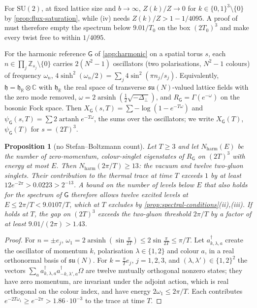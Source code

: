 \documentclass[11pt,a4paper]{amsart}
\newtheorem{proposition}[theorem]{Proposition}
\theoremstyle{definition}
\theoremstyle{remark}
\numberwithin{equation}{section}
\newcommand{\R}{\mathbb{R}}          %
\newcommand{\C}{\mathbb{C}}          %
\newcommand{\Z}{\mathbb{Z}}          %
\newcommand{\SU}{\mathrm{SU}}              %
\newcommand{\cube}[1]{(2#1)^3}             %
\newcommand{\Gharm}{\mathsf{G}}            %
\newcommand{\Mcirc}{\text{\upshape(M$^{\circ}$)}}   %
\newcommand{\Bcirc}{\text{\upshape(B$^{\circ}$)}}   %
\begin{document}
For $\SU(2)$, at fixed lattice size and $b\to\infty$, $Z(k)/Z\to0$ for $k\in\{0,1\}^3\setminus\{0\}$ by \cref{prop:flux-saturation}, while (iv) needs $Z(k)/Z>1-1/4095$. A proof of \Mcirc{} must therefore empty the spectrum below $9.01/T_0$ on the box $\cube{T_0}$ and make every twist free to within $1/4095$.

For the harmonic reference $\Gharm$ of \cref{app:harmonic} on a spatial torus $s$, each $n\in\prod_j\Z_{s_j}\setminus\{0\}$ carries $2(N^2-1)$ oscillators (two polarisations, $N^2-1$ colours) of frequency $\omega_n$, $4\sinh^2(\omega_n/2)=\sum_j4\sin^2(\pi n_j/s_j)$. Equivalently, $\mathfrak h=\mathfrak h_\R\otimes\C$ with $\mathfrak h_\R$ the real space of transverse $\mathfrak{su}(N)$-valued lattice fields with the zero mode removed, $\omega=2\operatorname{arsinh}(\frac12\sqrt{-\Delta_\perp})$, and $R_\Gharm=\Gamma(e^{-\omega})$ on the bosonic Fock space. Then $X_\Gharm(s,T)=\sum-\log(1-e^{-T\omega})$ and $\psi_\Gharm(s,T)=\sum2\operatorname{artanh}e^{-T\omega}$, the sums over the oscillators; we write $X_\Gharm(T)$, $\psi_\Gharm(T)$ for $s=\cube T$.

\begin{proposition}[no Stefan--Boltzmann count]\label{prop:no-stefan-boltzmann}
Let $T\ge3$ and let $N_{\mathrm{harm}}(E)$ be the number of zero-momentum, colour-singlet eigenstates of $R_\Gharm$ on $\cube T$ with energy at most $E$. Then $N_{\mathrm{harm}}(2\pi/T)\ge13$: the vacuum and twelve two-gluon singlets. Their contribution to the thermal trace at time $T$ exceeds $1$ by at least $12e^{-2\pi}>0.0223>2^{-13}$. A bound on the number of levels below $E$ that also holds for the spectrum of $\Gharm$ therefore allows twelve excited levels at $E\le2\pi/T<9.0107/T$, which \Bcirc{} at $T$ excludes by \cref{prop:spectral-conditions}(ii),(iii). If \Bcirc{} holds at $T$, the gap on $\cube T$ exceeds the two-gluon threshold $2\pi/T$ by a factor of at least $9.01/(2\pi)>1.43$.
\end{proposition}

\begin{proof}
For $n=\pm e_j$, $\omega_1=2\operatorname{arsinh}(\sin\frac\pi{2T})\le2\sin\frac\pi{2T}\le\pi/T$. Let $a^\dagger_{k,\lambda,a}$ create the oscillator of momentum $k$, polarisation $\lambda\in\{1,2\}$ and colour $a$, in a real orthonormal basis of $\mathfrak{su}(N)$. For $k=\frac\pi Te_j$, $j=1,2,3$, and $(\lambda,\lambda')\in\{1,2\}^2$ the vectors $\sum_aa^\dagger_{k,\lambda,a}a^\dagger_{-k,\lambda',a}\Omega$ are twelve mutually orthogonal nonzero states; they have zero momentum, are invariant under the adjoint action, which is real orthogonal on the colour index, and have energy $2\omega_1\le2\pi/T$. Each contributes $e^{-2T\omega_1}\ge e^{-2\pi}>1.86\cdot10^{-3}$ to the trace at time $T$.
\end{proof}
\end{document}
